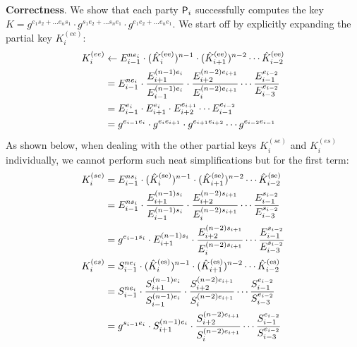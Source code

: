 \textbf{Correctness}. We show that each party $\User[i]$ successfully computes the key $K = g^{e_1s_2 + \dots e_ns_1}\cdot g^{s_1e_2 + \dots s_ne_1}\cdot g^{e_1e_2 + \dots e_ne_1}$.
We start off by explicitly expanding the partial key $K_i^{(ee)}$:
\begin{align*}
	K_i^{(ee)} &\gets E_{i-1}^{n\esk_i} \cdot (\hat{K}_i^\text{(ee)})^{n-1} \cdot (\hat{K}_{i+1}^\text{(ee)})^{n-2} \cdots \hat{K}_{i-2}^\text{(ee)}\\
	&= E_{i-1}^{n\esk_i} \cdot  \dfrac{\epk_{i+1}^{(n-1)\esk_i}}{\epk_{i-1}^{(n-1)\esk_i}} \cdot \dfrac{\epk_{i+2}^{(n-2)\esk_{i+1}}}{\epk_{i}^{(n-2)\esk_{i+1}}} \cdots  \dfrac{\epk_{i-1}^{\esk_{i-2}}}{\epk_{i-3}^{\esk_{i-2}}}  \\
	&= E_{i-1}^{\esk_i} \cdot  \epk_{i+1}^{\esk_i} \cdot \epk_{i+2}^{\esk_{i+1}} \cdots  \epk_{i-1}^{\esk_{i-2}}  \\
	&= g^{\esk_{i-1}\esk_i} \cdot  g^{\esk_i\esk_{i+1}} \cdot g^{\esk_{i+1}\esk_{i+2}} \cdots  g^{\esk_{i-2}\esk_{i-1}}  \\
\end{align*}
As shown below, when dealing with the other partial keys  $K_i^{(se)}$ and $K_i^{(es)}$  individually, we cannot perform such neat simplifications but for the first term:
 \begin{align*}
 	K_i^{(se)} &= \epk_{i-1}^{n\ssk_i} \cdot (\hat{K}_i^\text{(se)})^{n-1} \cdot (\hat{K}_{i+1}^\text{(se)})^{n-2} \cdots \hat{K}_{i-2}^\text{(se)} \\
 	&= \epk_{i-1}^{n\ssk_i} \cdot  \dfrac{\epk_{i+1}^{(n-1)\ssk_i}}{\epk_{i-1}^{(n-1)\ssk_i}} \cdot \dfrac{\epk_{i+2}^{(n-2)\ssk_{i+1}}}{\epk_{i}^{(n-2)\ssk_{i+1}}} \cdots  \dfrac{\epk_{i-1}^{\ssk_{i-2}}}{\epk_{i-3}^{\ssk_{i-2}}}  \\
 	&= g^{\esk_{i-1}\ssk_i} \cdot \epk_{i+1}^{(n-1)\ssk_i} \cdot \dfrac{\epk_{i+2}^{(n-2)\ssk_{i+1}}}{\epk_{i}^{(n-2)\ssk_{i+1}}} \cdots  \dfrac{\epk_{i-1}^{\ssk_{i-2}}}{\epk_{i-3}^{\ssk_{i-2}}}  \\
 	K_i^{(es)} &= \spk_{i-1}^{n\esk_i} \cdot (\hat{K}_i^\text{(es)})^{n-1} \cdot (\hat{K}_{i+1}^\text{(es)})^{n-2} \cdots \hat{K}_{i-2}^\text{(es)}  \\
 	&= \spk_{i-1}^{n\esk_i} \cdot  \dfrac{\spk_{i+1}^{(n-1)\esk_i}}{\spk_{i-1}^{(n-1)\esk_i}} \cdot \dfrac{\spk_{i+2}^{(n-2)\esk_{i+1}}}{\spk_{i}^{(n-2)\esk_{i+1}}} \cdots  \dfrac{\spk_{i-1}^{\esk_{i-2}}}{\spk_{i-3}^{\esk_{i-2}}}  \\
 	&= g^{\ssk_{i-1}\esk_i} \cdot \spk_{i+1}^{(n-1)\esk_i} \cdot \dfrac{\spk_{i+2}^{(n-2)\esk_{i+1}}}{\spk_{i}^{(n-2)\esk_{i+1}}} \cdots  \dfrac{\spk_{i-1}^{\esk_{i-2}}}{\spk_{i-3}^{\esk_{i-2}}}  \\
 \end{align*}
